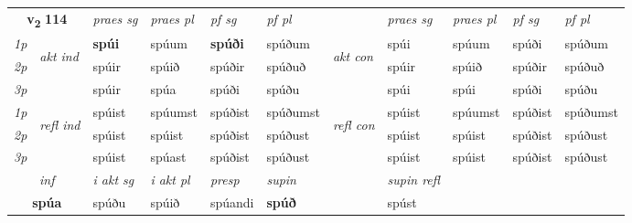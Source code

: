 \noindent
\begin{tabular}{lllllllllll} \toprule
\multicolumn{2}{c}{\textbf{v{\textsubscript{2}}} \Large{\textbf{114}}}  &  \textit{praes sg}  & \textit{praes pl}  &\textit{ pf sg} & \textit{pf pl} &  &  \textit{praes sg}  & \textit{praes pl}  & \textit{pf sg} & \textit{pf pl } \\*
	\cmidrule{3-6} \cmidrule{8-11}
 {\textit{1p}} & \multirow{3}{*}{\begin{turn}{90}\textit{akt ind}\end{turn}} & \textbf{spúi} & spúum & \textbf{spúði} & spúðum & \multirow{3}{*}{\begin{turn}{90}\textit{akt con}\end{turn}} &spúi & spúum & spúði & spúðum\\*
 {\textit{2p}} &  &  spúir  & spúið & spúðir & spúðuð & & spúir & spúið & spúðir & spúðuð \\*
{\textit{3p}} &  & spúir & spúa & spúði & spúðu & & spúi & spúi& spúði & spúðu \\*
\cmidrule{3-6} \cmidrule{8-11}
 {\textit{1p}} & \multirow{3}{*}{\begin{turn}{90}\textit{refl ind}\end{turn}}  & spúist & spúumst & spúðist & spúðumst & \multirow{3}{*}{\begin{turn}{90}\textit{refl con}\end{turn}}  &spúist & spúumst & spúðist & spúðumst \\*
 {\textit{2p}} &  & spúist & spúist & spúðist & spúðust & &spúist & spúist & spúðist & spúðust \\*
 {\textit{3p}}  & & spúist & spúast & spúðist & spúðust & & spúist & spúist& spúðist & spúðust \\*
\cmidrule{3-6} \cmidrule{8-11}

   \multicolumn{2}{c}{\textit{inf}}  & \textit{i akt sg} & \textit{i akt pl}   & \textit{presp} & \textit{supin} && \textit{supin refl}  \\*
  \multicolumn{2}{c}{\textbf{spúa}} & spúðu  & spúið   & spúandi &  \textbf{spúð} && spúst  \\*
\end{tabular}

